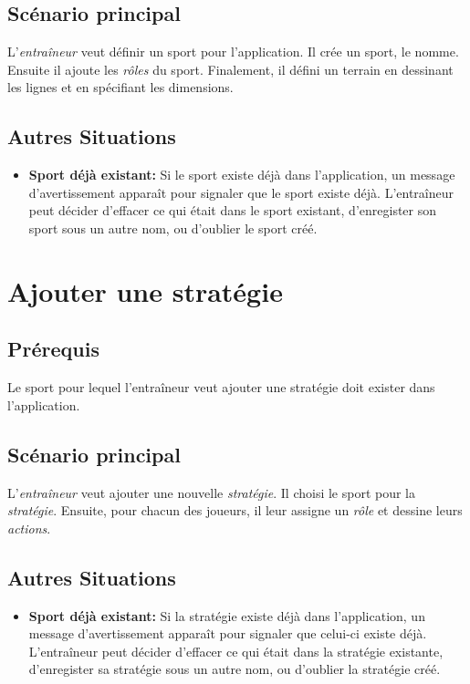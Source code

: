 \subsection{Sc\'enario principal}
\label{sub:sc'enario_principal}
L'\textit{entra\^ineur} veut définir un sport pour l'application.
Il cr\'ee un sport, le nomme.
Ensuite il ajoute les \textit{r\^oles} du sport.
Finalement, il d\'efini un terrain en dessinant les lignes et en sp\'ecifiant les dimensions.

\subsection{Autres Situations}
\label{sub:autres_situations}
\begin{itemize}
    \item \textbf{Sport d\'ej\`a existant:} Si le sport existe d\'ej\`a dans l'application, un message d'avertissement appara\^it pour signaler que le sport existe d\'ej\`a. 
    L'entraîneur peut d\'ecider d'effacer ce qui \'etait dans le sport existant, d'enregister son sport sous un autre nom, ou d'oublier le sport cr\'e\'e. 
\end{itemize}

\section{Ajouter une stratégie}
\label{sec:ajouter_une_strategie}

\subsection{Pr\'erequis}
\label{sub:prerequis}

Le sport pour lequel l'entraîneur veut ajouter une stratégie doit exister dans l'application.

\subsection{Sc\'enario principal}
\label{sub:sc'enario_principal}

L'\textit{entraîneur} veut ajouter une nouvelle \textit{stratégie}.
Il choisi le sport pour la \textit{strat\'egie}.
Ensuite, pour chacun des joueurs, il leur assigne un \textit{r\^ole} et dessine leurs \textit{actions}.

\subsection{Autres Situations}
\label{sub:autres_situations}
\begin{itemize}
    \item \textbf{Sport d\'ej\`a existant:} Si la stratégie existe d\'ej\`a dans l'application, un message d'avertissement appara\^it pour signaler que celui-ci existe d\'ej\`a. 
    L'entraîneur peut d\'ecider d'effacer ce qui \'etait dans la stratégie existante, d'enregister sa stratégie sous un autre nom, ou d'oublier la stratégie cr\'e\'e. 
\end{itemize}

